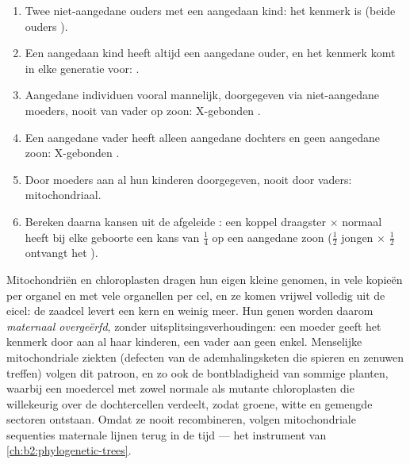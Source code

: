 \begin{method}\label{met:b2:meiosis-heredity:pedigree}
\begin{enumerate}
  \item Twee niet-aangedane ouders met een aangedaan kind: het kenmerk is
         (beide ouders ).
  \item Een aangedaan kind heeft altijd een aangedane ouder, en het
        kenmerk komt in elke generatie voor: .
  \item Aangedane individuen vooral mannelijk, doorgegeven via
        niet-aangedane moeders, nooit van vader op zoon: X-gebonden .
  \item Een aangedane vader heeft alleen aangedane dochters en geen
        aangedane zoon: X-gebonden .
  \item Door moeders aan al hun kinderen doorgegeven, nooit door
        vaders: mitochondriaal.
  \item Bereken daarna kansen uit de afgeleide :
        een koppel draagster $\times$ normaal heeft bij elke geboorte een kans
        van $\tfrac14$ op een aangedane zoon ($\tfrac12$ jongen $\times$ $\tfrac12$
        ontvangt het ).
\end{enumerate}
\end{method}

\begin{definition}\label{def:b2:meiosis-heredity:extranuclear}
Mitochondriën en chloroplasten dragen hun eigen kleine genomen, in vele
kopieën per organel en met vele organellen per cel, en ze komen vrijwel
volledig uit de eicel: de zaadcel levert een kern en weinig meer. Hun
genen worden daarom \emph{maternaal
overgeërfd}, zonder uitsplitsingsverhoudingen: een moeder geeft het
kenmerk door aan al haar kinderen, een vader aan geen enkel. Menselijke
mitochondriale ziekten (defecten van de ademhalingsketen die spieren en
zenuwen treffen) volgen dit patroon, en zo ook de bontbladigheid van
sommige planten, waarbij een moedercel met zowel normale als mutante
chloroplasten die willekeurig over de dochtercellen verdeelt, zodat groene,
witte en gemengde sectoren ontstaan. Omdat ze nooit recombineren, volgen
mitochondriale sequenties maternale lijnen terug in de tijd --- het
instrument van \cref{ch:b2:phylogenetic-trees}.
\end{definition}

